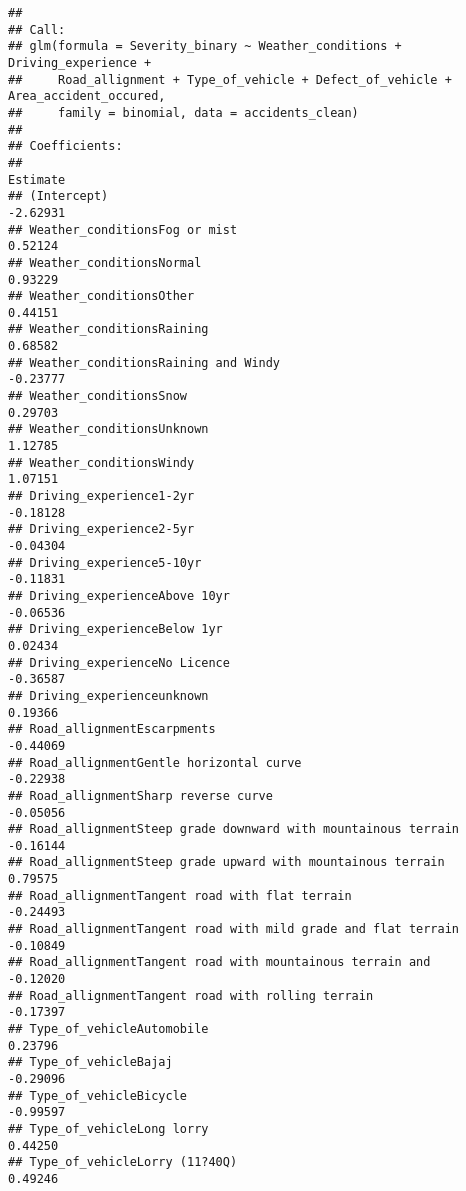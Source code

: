 \documentclass[
]{article}
\begin{document}
\begin{verbatim}
## 
## Call:
## glm(formula = Severity_binary ~ Weather_conditions + Driving_experience + 
##     Road_allignment + Type_of_vehicle + Defect_of_vehicle + Area_accident_occured, 
##     family = binomial, data = accidents_clean)
## 
## Coefficients:
##                                                               Estimate
## (Intercept)                                                   -2.62931
## Weather_conditionsFog or mist                                  0.52124
## Weather_conditionsNormal                                       0.93229
## Weather_conditionsOther                                        0.44151
## Weather_conditionsRaining                                      0.68582
## Weather_conditionsRaining and Windy                           -0.23777
## Weather_conditionsSnow                                         0.29703
## Weather_conditionsUnknown                                      1.12785
## Weather_conditionsWindy                                        1.07151
## Driving_experience1-2yr                                       -0.18128
## Driving_experience2-5yr                                       -0.04304
## Driving_experience5-10yr                                      -0.11831
## Driving_experienceAbove 10yr                                  -0.06536
## Driving_experienceBelow 1yr                                    0.02434
## Driving_experienceNo Licence                                  -0.36587
## Driving_experienceunknown                                      0.19366
## Road_allignmentEscarpments                                    -0.44069
## Road_allignmentGentle horizontal curve                        -0.22938
## Road_allignmentSharp reverse curve                            -0.05056
## Road_allignmentSteep grade downward with mountainous terrain  -0.16144
## Road_allignmentSteep grade upward with mountainous terrain     0.79575
## Road_allignmentTangent road with flat terrain                 -0.24493
## Road_allignmentTangent road with mild grade and flat terrain  -0.10849
## Road_allignmentTangent road with mountainous terrain and      -0.12020
## Road_allignmentTangent road with rolling terrain              -0.17397
## Type_of_vehicleAutomobile                                      0.23796
## Type_of_vehicleBajaj                                          -0.29096
## Type_of_vehicleBicycle                                        -0.99597
## Type_of_vehicleLong lorry                                      0.44250
## Type_of_vehicleLorry (11?40Q)                                  0.49246

\end{verbatim}
\end{document}
